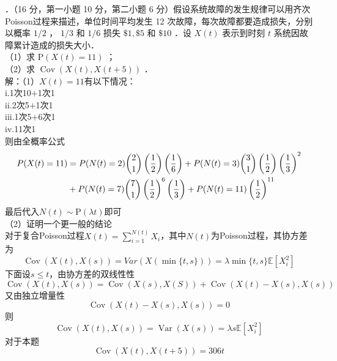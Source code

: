 \documentclass[UTF8]{ctexart}
\begin{document}
．（16 分，第一小题 10 分，第二小题 6 分）假设系统故障的发生规律可以用齐次 Poisson过程来描述，单位时间平均发生 12 次故障，每次故障都要造成损失，分别以概率 $1 / 2$ ， $1 / 3$ 和 $1 / 6$ 损失 $\$ 1, \$ 5$ 和 $\$ 10$ ．设 $X(t)$ 表示到时刻 $t$ 系统因故障累计造成的损失大小．\\
（1）求 $\mathrm{P}(X(t)=11)$ ；\\
（2）求 $\operatorname{Cov}(X(t), X(t+5))$ ．\\
解：（1）$X(t)=11$有以下情况：\\
i.1次10$+$1次1\\
ii.2次5$+$1次1\\
iii.1次5$+$6次1\\
iv.11次1\\
则由全概率公式
\begin{align*}
	P(X(t)=11) & =P(N(t)=2)\dbinom{2}{1}\left(\frac{1}{2} \right)\left(\frac{1}{6} \right)+  P(N(t)=3)\dbinom{3}{1}\left(\frac{1}{2} \right)\left(\frac{1}{3} \right)^2 \\
	 & +  P(N(t)=7)\dbinom{7}{1}\left(\frac{1}{2} \right)^6 \left(\frac{1}{3} \right)+  P(N(t)=11)\left(\frac{1}{2} \right)^{11}
\end{align*}
最后代入$N(t)\sim \mathrm{P}(\lambda t )$即可\\
（2）证明一个更一般的结论\\
对于复合Poisson过程$X(t)=\sum\limits_{i=1}^{N(t)} X_i$，其中$N(t)$为Poisson过程，其协方差为
\[
\operatorname{Cov}\left(X(t),X(s) \right)=Var(X(\min\{t,s\})) =\lambda \min\{t,s\}\mathbb{E}[X_i^2]
\]
下面设$s\le t$，由协方差的双线性性
\[
\operatorname{Cov}\left(X(t),X(s) \right)=\operatorname{Cov}(X(s),X(S))+\operatorname{Cov}(X(t)-X(s),X(s))
\]
又由独立增量性
\[
\operatorname{Cov}(X(t)-X(s),X(s))=0
\]
则
\[
\operatorname{Cov}\left(X(t),X(s) \right)=\operatorname{Var}(X(s)) =\lambda s\mathbb{E}[X_i^2]
\]
对于本题
\[
\operatorname{Cov}(X(t), X(t+5))=306t
\]\\
\end{document}
